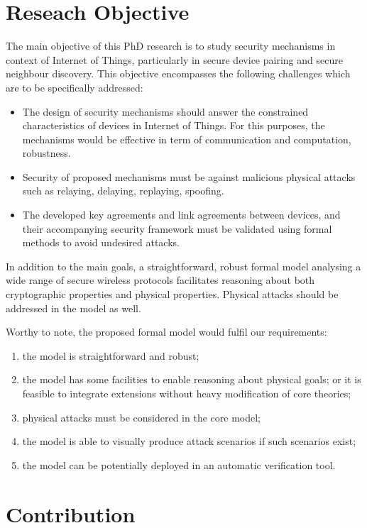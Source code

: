 \section{Reseach Objective}

The main objective of this PhD research is to study security mechanisms in context of Internet of Things, particularly in secure device pairing and secure neighbour discovery. This objective encompasses the following challenges which are to be specifically addressed:
\begin{itemize}
\item The design of security mechanisms should answer the constrained characteristics of devices in Internet of Things. For this purposes, the mechanisms would be effective in term of communication and computation, robustness.
\item Security of proposed mechanisms must be against malicious physical attacks such as relaying, delaying, replaying, spoofing. 
\item The developed key agreements and link agreements between devices, and their accompanying security framework must be validated using formal methods to avoid undesired attacks.  
\end{itemize}

In addition to the main goals, a straightforward, robust formal model analysing a wide range of secure wireless protocols facilitates reasoning about both cryptographic properties and physical properties. Physical attacks should be addressed in the model as well.  

Worthy to note, the proposed formal model would fulfil our requirements:
\begin{enumerate}
\item the model is straightforward and robust; 
\item the model has some facilities to enable reasoning about physical goals; or it is feasible to integrate extensions without heavy modification of core theories;
\item physical attacks must be considered in the core model;
\item the model is able to visually produce attack scenarios if such scenarios exist; 
\item the model can be potentially deployed in an automatic verification tool. 
\end{enumerate}

\section{Contribution}

